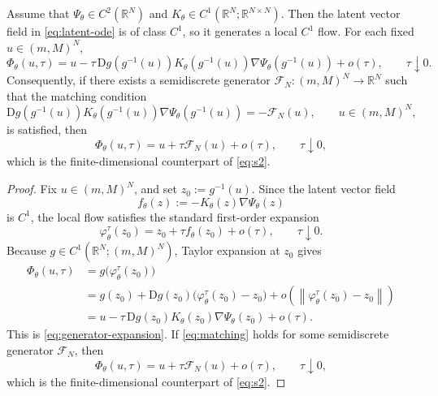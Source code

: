 \documentclass[hidelinks,review,nohypdvips,onefignum,onetabnum]{siamart220329}
\newcommand{\R}{\mathbb{R}}
\newcommand{\cFN}{\mathcal{F}_N}
\newcommand{\PhiT}{\Phi_{\theta}}
\newcommand{\norm}[1]{\left\lVert #1 \right\rVert}
\begin{document}
\begin{proposition}\label{prop:generator}
Assume that \(\Psi_{\theta}\in C^2(\R^N)\) and \(K_{\theta}\in C^1(\R^N;\R^{N\times N})\). Then the latent vector field in \eqref{eq:latent-ode} is of class \(C^1\), so it generates a local \(C^1\) flow. For each fixed \(u\in (m,M)^N\),
\begin{equation}\label{eq:generator-expansion}
\PhiT(u,\tau)=u-\tau\,\mathrm{D}g(g^{-1}(u))K_{\theta}(g^{-1}(u))\nabla \Psi_{\theta}(g^{-1}(u))+o(\tau), \qquad \tau\downarrow 0.
\end{equation}
Consequently, if there exists a semidiscrete generator \(\cFN:(m,M)^N\to \R^N\) such that the matching condition
\begin{equation}\label{eq:matching}
\mathrm{D}g(g^{-1}(u))K_{\theta}(g^{-1}(u))\nabla \Psi_{\theta}(g^{-1}(u))=-\cFN(u), \qquad u\in (m,M)^N,
\end{equation}
is satisfied, then
\begin{equation*}
\PhiT(u,\tau)=u+\tau\cFN(u)+o(\tau), \qquad \tau\downarrow 0,
\end{equation*}
which is the finite-dimensional counterpart of \eqref{eq:s2}.
\end{proposition}

\begin{proof}
Fix \(u\in (m,M)^N\), and set \(z_0:=g^{-1}(u)\). Since the latent vector field
\begin{equation*}
f_{\theta}(z):=-K_{\theta}(z)\nabla \Psi_{\theta}(z)
\end{equation*}
is \(C^1\), the local flow satisfies the standard first-order expansion
\begin{equation*}
\varphi_{\theta}^{\tau}(z_0)=z_0+\tau f_{\theta}(z_0)+o(\tau), \qquad \tau\downarrow 0.
\end{equation*}
Because \(g\in C^1(\R^N;(m,M)^N)\), Taylor expansion at \(z_0\) gives
\begin{align*}
\PhiT(u,\tau)
&=g\bigl(\varphi_{\theta}^{\tau}(z_0)\bigr) \\
&=g(z_0)+\mathrm{D}g(z_0)\bigl(\varphi_{\theta}^{\tau}(z_0)-z_0\bigr)+o\!\left(\norm{\varphi_{\theta}^{\tau}(z_0)-z_0}\right) \\
&=u-\tau\,\mathrm{D}g(z_0)K_{\theta}(z_0)\nabla\Psi_{\theta}(z_0)+o(\tau).
\end{align*}
This is \eqref{eq:generator-expansion}. If \eqref{eq:matching} holds for some semidiscrete generator \(\cFN\), then
\begin{equation*}
\PhiT(u,\tau)=u+\tau\cFN(u)+o(\tau), \qquad \tau\downarrow 0,
\end{equation*}
which is the finite-dimensional counterpart of \eqref{eq:s2}.
\end{proof}
\end{document}
